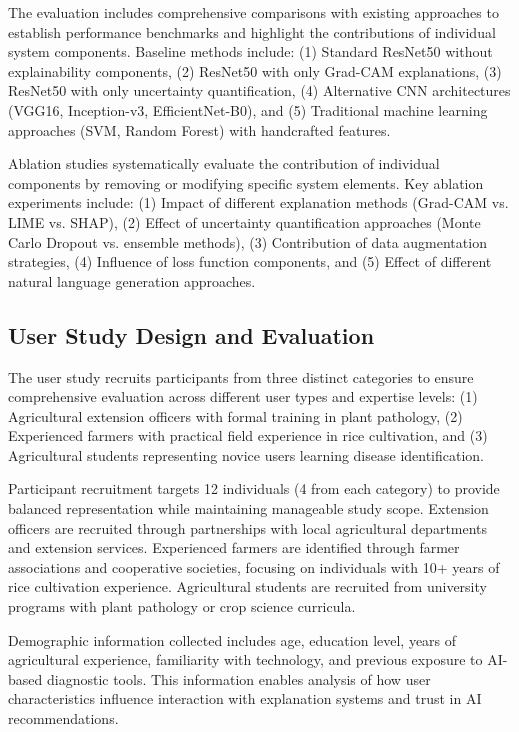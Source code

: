 \documentclass[agriculture,article,submit,pdftex,moreauthors]{Definitions/mdpi}
\begin{document}
The evaluation includes comprehensive comparisons with existing approaches to establish performance benchmarks and highlight the contributions of individual system components. Baseline methods include: (1) Standard ResNet50 without explainability components, (2) ResNet50 with only Grad-CAM explanations, (3) ResNet50 with only uncertainty quantification, (4) Alternative CNN architectures (VGG16, Inception-v3, EfficientNet-B0), and (5) Traditional machine learning approaches (SVM, Random Forest) with handcrafted features.

Ablation studies systematically evaluate the contribution of individual components by removing or modifying specific system elements. Key ablation experiments include: (1) Impact of different explanation methods (Grad-CAM vs. LIME vs. SHAP), (2) Effect of uncertainty quantification approaches (Monte Carlo Dropout vs. ensemble methods), (3) Contribution of data augmentation strategies, (4) Influence of loss function components, and (5) Effect of different natural language generation approaches.

\subsection{User Study Design and Evaluation}


The user study recruits participants from three distinct categories to ensure comprehensive evaluation across different user types and expertise levels: (1) Agricultural extension officers with formal training in plant pathology, (2) Experienced farmers with practical field experience in rice cultivation, and (3) Agricultural students representing novice users learning disease identification.

Participant recruitment targets 12 individuals (4 from each category) to provide balanced representation while maintaining manageable study scope. Extension officers are recruited through partnerships with local agricultural departments and extension services. Experienced farmers are identified through farmer associations and cooperative societies, focusing on individuals with 10+ years of rice cultivation experience. Agricultural students are recruited from university programs with plant pathology or crop science curricula.

Demographic information collected includes age, education level, years of agricultural experience, familiarity with technology, and previous exposure to AI-based diagnostic tools. This information enables analysis of how user characteristics influence interaction with explanation systems and trust in AI recommendations.
\end{document}
